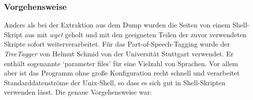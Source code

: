 \documentclass[pagesize,DIV=calc,12pt,draft]{scrreprt}
\begin{document}
\subsubsection{Vorgehensweise}

Anders als bei der Extraktion aus dem Dump wurden die Seiten von einem
Shell-Skript aus mit \emph{wget} geholt und mit den geeigneten Teilen
der zuvor verwendeten Skripte sofort weiterverarbeitet. Für das
Part-of-Speech-Tagging wurde der \emph{TreeTagger} von Helmut Schmid von
der Universität Stuttgart verwendet. Er enthält sogenannte `parameter
files' für eine Vielzahl von Sprachen. Vor allem aber ist das Programm
ohne große Konfiguration recht schnell und verarbeitet
Standarddatenströme der Unix-Shell, so dass es sich gut in
Shell-Skripten verwenden lässt. Die genaue Vorgehensweise war:
\end{document}
